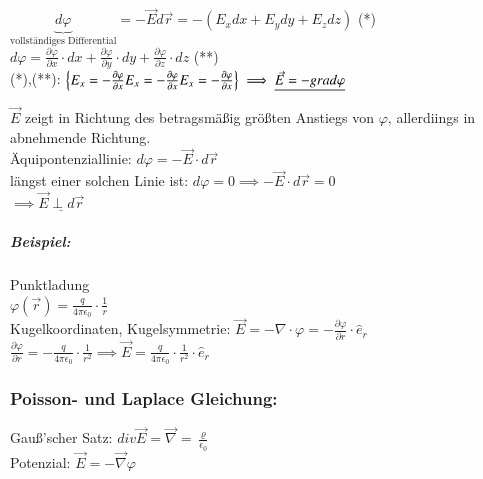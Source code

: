 \documentclass[11pt]{article}
\begin{document}
$ \underbrace{d\varphi}_{\text{vollständiges Differential}}= -\vec{E}d\vec{r} = - (E_xdx+E_ydy+E_zdz)$ (*) \\

$ d\varphi=\frac{\partial\varphi}{\partial x}\cdot dx +\frac{\partial\varphi}{\partial y}\cdot dy+\frac{\partial\varphi}{\partial z}\cdot dz $ (**)\\

(*),(**): \begin{math}
\left\{ E_x= -\frac{\partial\varphi}{\partial x}\\ E_x= -\frac{\partial\varphi}{\partial x}\\ E_x= -\frac{\partial\varphi}{\partial x}  \right\} \implies \underline{\vec{E}=-grad\varphi}\\ \end{math}  

$\vec{E}$ zeigt in Richtung des betragsmäßig größten Anstiegs von $\varphi$, allerdiings in abnehmende Richtung.\\

Äquipontenziallinie: $ d\varphi= -\vec{E}\cdot d\vec{r} $\\
längst einer solchen Linie ist: $ d\varphi=0\implies -\vec{E}\cdot d\vec{r}=0 $\\
$ \implies \underline{\vec{E}\perp d\vec{r}} $\\


\subparagraph{Beispiel:} Punktladung\\

$ \varphi(\vec{r})=\frac{q}{4\pi\epsilon_0}\cdot \frac{1}{r} $\\

Kugelkoordinaten, Kugelsymmetrie: $ \vec{E}=-\nabla\cdot\varphi=-\frac{\partial\varphi}{\partial r}\cdot \hat{e}_r $\\

$ \frac{\partial\varphi}{\partial r}=-\frac{q}{4\pi\epsilon_0}\cdot\frac{1}{r^2} \implies \vec{E}=\frac{q}{4\pi\epsilon_0}\cdot \frac{1}{r^2}\cdot\hat{e}_r$\\

\subsubsection{Poisson- und Laplace Gleichung:}

Gauß'scher Satz: $div\vec{E}=\vec{\nabla}=\frac{\varrho}{\epsilon_0}$\\
Potenzial: $\vec{E}=-\vec{\nabla}\varphi$\\
\end{document}
